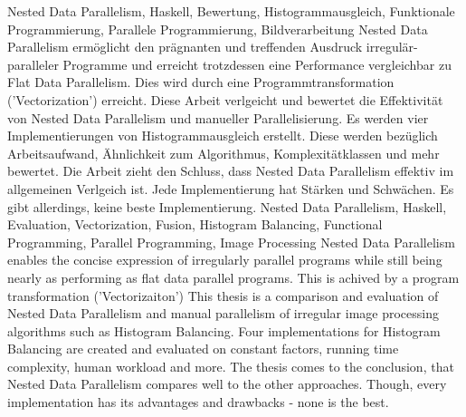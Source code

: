 \documentclass[draft=false
              ,paper=a4
              ,twoside=false
              ,fontsize=11pt
              ,headsepline
              ,BCOR10mm
              ,DIV11
              ]{scrbook}
\newcommand{\algo}[0]{Histogram Balancing\xspace}
\begin{document}


\frontmatter

\maketitle

\onehalfspacing

\HAWAbstractPage
{Nested Data Parallelism, Haskell,
Bewertung, Histogrammausgleich,
Funktionale Programmierung, Parallele Programmierung, Bildverarbeitung}%
{
Nested Data Parallelism
ermöglicht den prägnanten und treffenden
Ausdruck irregulär-paralleler Programme
und erreicht trotzdessen eine Performance
vergleichbar zu Flat Data Parallelism.
Dies wird durch eine Programmtransformation ('Vectorization')
erreicht.
Diese Arbeit verlgeicht und bewertet die Effektivität
von Nested Data Parallelism und manueller Parallelisierung.
Es werden vier Implementierungen von Histogrammausgleich erstellt.
Diese werden bezüglich Arbeitsaufwand, Ähnlichkeit
zum Algorithmus, Komplexitätklassen und mehr bewertet.
Die Arbeit zieht den Schluss, dass Nested Data Parallelism
effektiv im allgemeinen Verlgeich ist.
Jede Implementierung hat Stärken und Schwächen. Es gibt
allerdings, keine beste Implementierung.}%
{Nested Data Parallelism, Haskell, Evaluation,
Vectorization, Fusion, Histogram Balancing,
Functional Programming, Parallel Programming,
Image Processing}%
{
Nested Data Parallelism enables
the concise expression of irregularly parallel programs
while still being nearly as performing as flat data parallel programs.
This is achived by a program transformation ('Vectorizaiton')
This thesis is a comparison and evaluation of Nested Data Parallelism
and manual parallelism of irregular image processing algorithms such as \algo.
Four implementations for \algo are created and evaluated on
constant factors, running time complexity, human workload and more. 
The thesis comes to the conclusion, that Nested Data Parallelism
compares well to the other approaches.
Though, every implementation has its advantages and drawbacks -
none is the best.}
\end{document}
